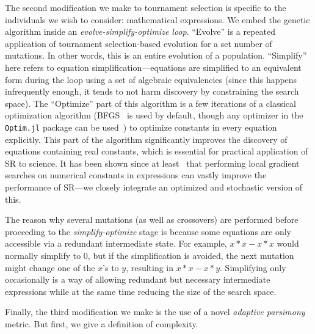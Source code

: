 \documentclass[letterpaper,twocolumn]{scrartcl}
\newcommand\we{we\xspace}
\newcommand\We{We\xspace}
\newcommand\sr{SR\xspace}
\begin{document}
The second modification \we make to tournament selection is specific to the individuals \we wish to consider: mathematical expressions.
\We embed the genetic algorithm inside an \textit{evolve-simplify-optimize loop}.
``Evolve'' is a repeated application of tournament selection-based evolution for a set number of mutations.
In other words, this is an entire evolution of a population.
``Simplify'' here refers to equation simplification---equations are simplified to an equivalent form during the loop using a set of algebraic equivalencies (since this happens infrequently enough, it tends to not harm discovery by constraining the search space).
The ``Optimize'' part of this algorithm is a few iterations of a classical optimization algorithm (BFGS~\cite{broydenConvergenceClassDoublerank1970} is used by default, though any optimizer in the \texttt{Optim.jl} package can be used~\cite{mogensenOptimMathematicalOptimization2018}) to optimize constants in every equation explicitly.
This part of the algorithm significantly improves the discovery of equations containing real constants, which is essential for practical application of \sr to science.
It has been shown since at least~\cite{topchyFasterGeneticProgramming2001} that performing local gradient searches on numerical constants in expressions can vastly improve the performance of \sr---\we closely integrate an optimized and stochastic version of this.

The reason why several mutations (as well as crossovers) are performed before proceeding to the \textit{simplify-optimize} stage is because some equations are only accessible via a redundant intermediate state.
For example, $x\ast x - x\ast x$ would normally simplify to $0$, but if the simplification is avoided, the next mutation might change one of the $x$'s to $y$, resulting in $x\ast x - x \ast y$.
Simplifying only occasionally is a way of allowing redundant but necessary intermediate expressions while at the same time reducing the size of the search space.

Finally, the third modification \we make is the use of a novel \textit{adaptive parsimony} metric.
But first, \we give a definition of complexity.
\end{document}
